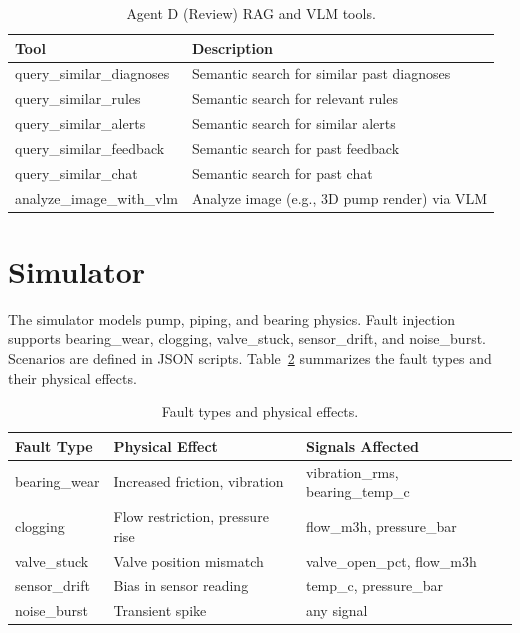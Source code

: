 \documentclass[12pt,letterpaper]{report}
\begin{document}
\begin{table}[htbp]
\centering
\caption{Agent D (Review) RAG and VLM tools.}
\label{tab:agentd}
\begin{tabular}{ll}
\toprule
\textbf{Tool} & \textbf{Description} \\
\midrule
query\_similar\_diagnoses & Semantic search for similar past diagnoses \\
query\_similar\_rules & Semantic search for relevant rules \\
query\_similar\_alerts & Semantic search for similar alerts \\
query\_similar\_feedback & Semantic search for past feedback \\
query\_similar\_chat & Semantic search for past chat \\
analyze\_image\_with\_vlm & Analyze image (e.g., 3D pump render) via VLM \\
\bottomrule
\end{tabular}
\end{table}

\section{Simulator}

The simulator models pump, piping, and bearing physics. Fault injection supports bearing\_wear, clogging, valve\_stuck, sensor\_drift, and noise\_burst. Scenarios are defined in JSON scripts. Table~\ref{tab:faults} summarizes the fault types and their physical effects.

\begin{table}[htbp]
\centering
\caption{Fault types and physical effects.}
\label{tab:faults}
\begin{tabular}{lll}
\toprule
\textbf{Fault Type} & \textbf{Physical Effect} & \textbf{Signals Affected} \\
\midrule
bearing\_wear & Increased friction, vibration & vibration\_rms, bearing\_temp\_c \\
clogging & Flow restriction, pressure rise & flow\_m3h, pressure\_bar \\
valve\_stuck & Valve position mismatch & valve\_open\_pct, flow\_m3h \\
sensor\_drift & Bias in sensor reading & temp\_c, pressure\_bar \\
noise\_burst & Transient spike & any signal \\
\bottomrule
\end{tabular}
\end{table}
\end{document}
